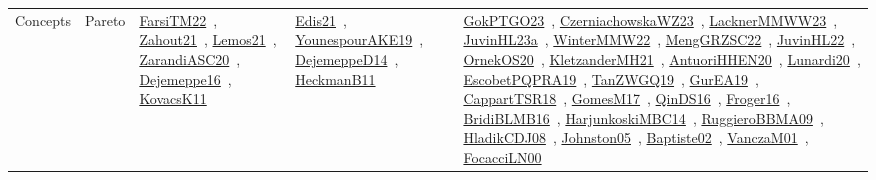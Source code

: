 {\begin{longtable}{lp{3cm}>{\raggedright\arraybackslash}p{6cm}>{\raggedright\arraybackslash}p{6cm}>{\raggedright\arraybackslash}p{8cm}}
Concepts & Pareto & \href{../works/FarsiTM22.pdf}{FarsiTM22}~\cite{FarsiTM22}, \href{../works/Zahout21.pdf}{Zahout21}~\cite{Zahout21}, \href{../works/Lemos21.pdf}{Lemos21}~\cite{Lemos21}, \href{../works/ZarandiASC20.pdf}{ZarandiASC20}~\cite{ZarandiASC20}, \href{../works/Dejemeppe16.pdf}{Dejemeppe16}~\cite{Dejemeppe16}, \href{../works/KovacsK11.pdf}{KovacsK11}~\cite{KovacsK11} & \href{../works/Edis21.pdf}{Edis21}~\cite{Edis21}, \href{../works/YounespourAKE19.pdf}{YounespourAKE19}~\cite{YounespourAKE19}, \href{../works/DejemeppeD14.pdf}{DejemeppeD14}~\cite{DejemeppeD14}, \href{../works/HeckmanB11.pdf}{HeckmanB11}~\cite{HeckmanB11} & \href{../works/GokPTGO23.pdf}{GokPTGO23}~\cite{GokPTGO23}, \href{../works/CzerniachowskaWZ23.pdf}{CzerniachowskaWZ23}~\cite{CzerniachowskaWZ23}, \href{../works/LacknerMMWW23.pdf}{LacknerMMWW23}~\cite{LacknerMMWW23}, \href{../works/JuvinHL23a.pdf}{JuvinHL23a}~\cite{JuvinHL23a}, \href{../works/WinterMMW22.pdf}{WinterMMW22}~\cite{WinterMMW22}, \href{../works/MengGRZSC22.pdf}{MengGRZSC22}~\cite{MengGRZSC22}, \href{../works/JuvinHL22.pdf}{JuvinHL22}~\cite{JuvinHL22}, \href{../works/OrnekOS20.pdf}{OrnekOS20}~\cite{OrnekOS20}, \href{../works/KletzanderMH21.pdf}{KletzanderMH21}~\cite{KletzanderMH21}, \href{../works/AntuoriHHEN20.pdf}{AntuoriHHEN20}~\cite{AntuoriHHEN20}, \href{../works/Lunardi20.pdf}{Lunardi20}~\cite{Lunardi20}, \href{../works/EscobetPQPRA19.pdf}{EscobetPQPRA19}~\cite{EscobetPQPRA19}, \href{../works/TanZWGQ19.pdf}{TanZWGQ19}~\cite{TanZWGQ19}, \href{../works/GurEA19.pdf}{GurEA19}~\cite{GurEA19}, \href{../works/CappartTSR18.pdf}{CappartTSR18}~\cite{CappartTSR18}, \href{../works/GomesM17.pdf}{GomesM17}~\cite{GomesM17}, \href{../works/QinDS16.pdf}{QinDS16}~\cite{QinDS16}, \href{../works/Froger16.pdf}{Froger16}~\cite{Froger16}, \href{../works/BridiBLMB16.pdf}{BridiBLMB16}~\cite{BridiBLMB16}, \href{../works/HarjunkoskiMBC14.pdf}{HarjunkoskiMBC14}~\cite{HarjunkoskiMBC14}, \href{../works/RuggieroBBMA09.pdf}{RuggieroBBMA09}~\cite{RuggieroBBMA09}, \href{../works/HladikCDJ08.pdf}{HladikCDJ08}~\cite{HladikCDJ08}, \href{../works/Johnston05.pdf}{Johnston05}~\cite{Johnston05}, \href{../works/Baptiste02.pdf}{Baptiste02}~\cite{Baptiste02}, \href{../works/VanczaM01.pdf}{VanczaM01}~\cite{VanczaM01}, \href{../works/FocacciLN00.pdf}{FocacciLN00}~\cite{FocacciLN00}\\

\end{longtable}}
